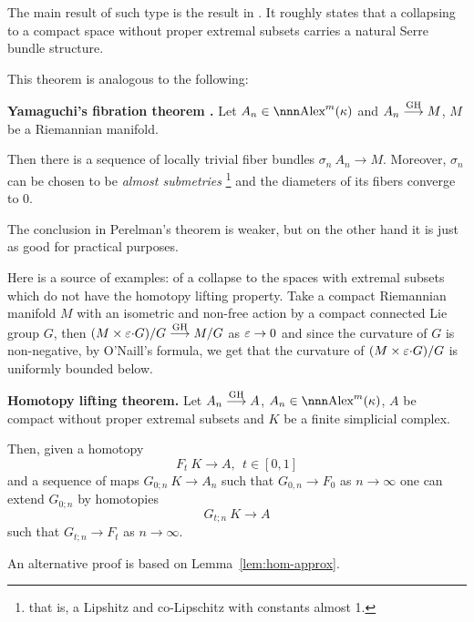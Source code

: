 \documentclass{article}
\begin{document}
The main result of such type is the result in
\cite{perelman:collapsing}. 
It roughly states that a collapsing to a compact
space without proper extremal subsets carries a natural Serre bundle structure.

This theorem is analogous to  the following:
\begin{thm}{\bf Yamaguchi's fibration theorem
\cite{yamaguchi:bundle}.}
Let $A_n\in\Alex^m(\kappa)$ and $A_n\GHto M$, $M$ be a Riemannian manifold.

Then there is a sequence of locally trivial fiber bundles $\sigma_n\:A_n\to M$.
Moreover, $\sigma_n$ can be chosen to be \emph{almost submetries}%
\footnote{that is, a Lipshitz and co-Lipschitz with constants almost 1.} 
and the diameters of
its fibers converge to $0$.
\end{thm}
The conclusion in Perelman's theorem is weaker, but on the other hand it is just
as good for practical purposes. 

Here is a source of examples: 
of a collapse to the spaces with
extremal subsets which do not have the homotopy lifting property. 
Take a compact Riemannian manifold $M$ with an isometric and
non-free action by a compact connected Lie group $G$, then $(M\times \eps
{\cdot}G)/G\GHto M/G$ as $\varepsilon\to0$ and since the curvature of $G$ is non-negative, by
O'Naill's formula, we get that the curvature of $(M\times \varepsilon {\cdot}G)/G$ is uniformly bounded
below.

\begin{thm}
{\bf Homotopy lifting theorem.}
\label{thm:per-ser} Let $A_n\GHto A$, $A_n\in\Alex^m(\kappa)$, $A$ be compact
without proper extremal subsets and $K$ be a finite simplicial complex. 

Then, given a homotopy 
$$F_t\:K\to A,\ \ t\in [0,1]$$ 
and a sequence of maps 
$G_{0;n}\:K\to A_n$ such that $G_{0,n}\to F_0$ as $n\to\infty$ one can extend
$G_{0;n}$ by homotopies 
$$G_{t;n}\:K\to A$$
such that $G_{t;n}\to F_t$ as $n\to\infty$.
\end{thm}

An alternative proof is based on Lemma~\ref{lem:hom-approx}.
\end{document}
